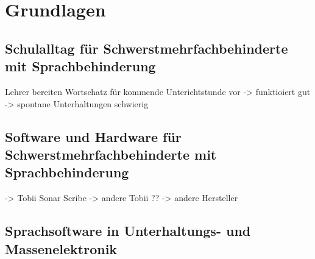 \section{Grundlagen}

	\subsection{Schulalltag für Schwerstmehrfachbehinderte mit Sprachbehinderung}
    
    Lehrer bereiten Wortschatz für kommende Unterichtstunde vor
    -> funktioiert gut
    -> spontane Unterhaltungen schwierig
    
	\subsection{Software und Hardware für Schwerstmehrfachbehinderte mit Sprachbehinderung}
    
    -> Tobii Sonar Scribe
    -> andere Tobii ??
    -> andere Hersteller
    
	\subsection{Sprachsoftware in Unterhaltungs- und Massenelektronik}